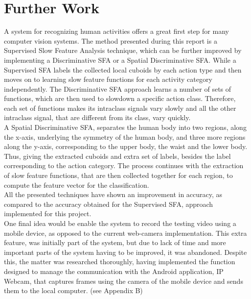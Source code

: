 \documentclass[11pt]{report}
\begin{document}
\section{Further Work}
A system for recognizing human activities offers a great first step for many computer vision systems. The method presented during this report is a Supervised Slow Feature Analysis technique, which can be further improved by implementing a Discriminative SFA or a Spatial Discriminative SFA. 
While a Supervised SFA labels the collected local cuboids by each action type and then moves on to learning slow feature functions for each activity category independently. The Discriminative SFA approach learns a number of sets of functions, which are then used to slowdown a specific action class. Therefore, each set of functions makes its intraclass signals vary slowly and all the other intraclass signal, that are different from its class, vary quickly.\\ 
A Spatial Discriminative SFA, separates the human body into two regions, along the x-axis, underlying the symmetry of the human body, and three more regions along the y-axis, corresponding to the upper body, the waist and the lower body. Thus, giving the extracted cuboids and extra set of labels, besides the label corresponding to the action category. The process continues with the extraction of slow feature functions, that are then collected together for each region, to compute the feature vector for the classification. \\
All the presented techniques have shown an improvement in accuracy, as compared to the accuracy obtained for the Supervised SFA, approach implemented for this project. \\
One final idea would be enable the system to record the testing video using a mobile device, as opposed to the current web-camera implementation. This extra feature, was initially part of the system, but due to lack of time and more important parts of the system having to be improved, it was abandoned. Despite this, the matter was researched thoroughly, having implemented the function designed to manage the communication with the Android application, IP Webcam, that captures frames using the camera of the mobile device and sends them to the local computer. (see Appendix B)\\

\clearpage



\end{document}

